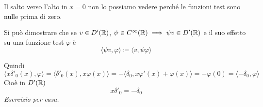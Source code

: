 Il salto verso l'alto in $x = 0$ non lo possiamo vedere perché le funzioni test sono nulle prima di zero.
\Soluzione
\begin{rem}
Si può dimostrare che se $v\in D'(\mathbb{R})$, $\psi \in C^{\infty}(\mathbb{R}) \implies \psi v\in D'(\mathbb{R})$ e il suo effetto su una funzione test $\varphi $ è
\begin{equation*}
\langle \psi v, \varphi \rangle \coloneqq \langle v, \psi \varphi \rangle
\end{equation*}
\end{rem}
Quindi
\begin{equation*}
\langle x\delta '_{0} (x), \varphi \rangle = \langle \delta '_{0} (x), x\varphi (x) \rangle = - \langle \delta_{0}, x\varphi '(x) + \varphi (x) \rangle = - \varphi (0) = \langle - \delta_{0}, \varphi \rangle
\end{equation*}
Cioè in $D'(\mathbb{R})$
\begin{equation*}
x\delta '_{0} = - \delta_{0}
\end{equation*}
\textit{Esercizio per casa.}

